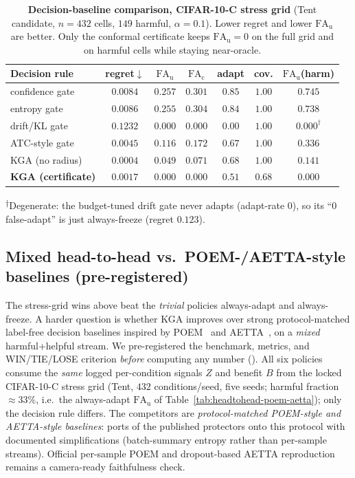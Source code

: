 \begin{table}[t]\centering\small
\caption{\textbf{Decision-baseline comparison, CIFAR-10-C stress grid} (Tent candidate, $n{=}432$
cells, $149$ harmful, $\alpha{=}0.1$). Lower regret and lower $\mathrm{FA}_{\mathrm u}$ are better.
Only the conformal certificate keeps $\mathrm{FA}_{\mathrm u}{=}0$ on the full grid and on harmful
cells while staying near-oracle.}
\label{tab:gates}
\begin{tabular}{lcccccc}
\toprule
Decision rule & regret$\downarrow$ & $\mathrm{FA}_{\mathrm u}$ & $\mathrm{FA}_{\mathrm c}$ & adapt & cov. & $\mathrm{FA}_{\mathrm u}$(harm) \\
\midrule
confidence gate & $0.0084$ & $0.257$ & $0.301$ & $0.85$ & $1.00$ & $0.745$ \\
entropy gate & $0.0086$ & $0.255$ & $0.304$ & $0.84$ & $1.00$ & $0.738$ \\
drift/KL gate & $0.1232$ & $0.000$ & $0.000$ & $0.00$ & $1.00$ & $0.000^{\dagger}$ \\
ATC-style gate & $0.0045$ & $0.116$ & $0.172$ & $0.67$ & $1.00$ & $0.336$ \\
\textsc{KGA} (no radius) & $0.0004$ & $0.049$ & $0.071$ & $0.68$ & $1.00$ & $0.141$ \\
\textbf{\textsc{KGA} (certificate)} & $0.0017$ & $\mathbf{0.000}$ & $\mathbf{0.000}$ & $0.51$ & $0.68$ & $\mathbf{0.000}$ \\
\bottomrule
\end{tabular}

{\footnotesize\textsuperscript{$\dagger$}Degenerate: the budget-tuned drift gate never adapts
(adapt-rate $0$), so its ``$0$ false-adapt'' is just always-freeze (regret $0.123$).}
\end{table}

\subsection{Mixed head-to-head vs.\ POEM-/AETTA-style baselines (pre-registered)}
The stress-grid wins above beat the \emph{trivial} policies always-adapt and always-freeze. A harder
question is whether \textsc{KGA} improves over strong protocol-matched label-free decision baselines
inspired by POEM~\cite{bar2024poem} and AETTA~\cite{lee2024aetta}, on a
\emph{mixed} harmful+helpful stream. We pre-registered the benchmark, metrics, and WIN/TIE/LOSE
criterion \emph{before} computing any number ().
All six policies consume the \emph{same} logged per-condition signals $Z$ and benefit $B$ from the
locked CIFAR-10-C stress grid (Tent, $432$ conditions/seed, five seeds; harmful fraction
${\approx}33\%$, i.e.\ the always-adapt $\mathrm{FA}_{\mathrm u}$ of Table~\ref{tab:headtohead-poem-aetta}); only the decision rule differs. The competitors are
\emph{protocol-matched POEM-style and AETTA-style baselines}: ports of the published protectors
onto this protocol with documented simplifications (batch-summary entropy rather than per-sample
streams). Official per-sample POEM and dropout-based AETTA reproduction remains a camera-ready
faithfulness check.


